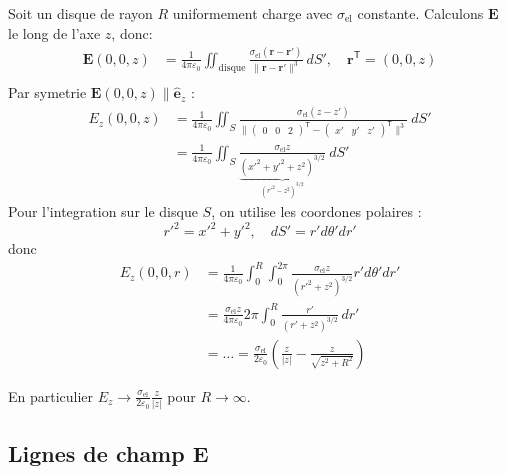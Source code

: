 \begin{example}
Soit un disque de rayon $R$ uniformement charge avec $\sigma _{\mathrm{el}}$ constante. Calculons $\boldsymbol{E}$ le long de l'axe $z$, donc:
\begin{align*}
\boldsymbol{E}(0,0,z) & =\frac{1}{4\pi \varepsilon _{0}}\iint _{\mathrm{disque}} \frac{\sigma _{\mathrm{el}}(\boldsymbol{r}-\boldsymbol{r}') }{\lVert \boldsymbol{r}-\boldsymbol{r}' \rVert ^{3}}~dS',\quad \boldsymbol{r}^{\mathsf{T}}=(0,0,z) \\
\end{align*}
Par symetrie $\boldsymbol{E}(0,0,z)\parallel \boldsymbol{\hat{e}}_{z}$ :
\begin{align*}
E_{z}(0,0,z) & =\frac{1}{4\pi\varepsilon_{0}}\iint _{S} \frac{\sigma _{\mathrm{el}}(z-z')}{\lVert \begin{pmatrix}
0 & 0 & 2
\end{pmatrix}^{\mathsf{T}}-\begin{pmatrix}
x' & y' & z'
\end{pmatrix}^{\mathsf{T}} \rVert ^{3}}~dS' \\
 & =\frac{1}{4\pi \varepsilon_{0}}\iint _{S} \frac{\sigma _{\mathrm{el}}z}{\underbrace{ (x'^{2}+y'^{2}+z^{2})^{3/2} }_{ (r'^{2}-z^{2})^{3/2} }}~dS'
\end{align*}
Pour l'integration sur le disque $S$, on utilise les coordones polaires :
$$
r'^{2}=x'^{2}+y'^{2},\quad dS'=r'd\theta'dr'
$$
donc
\begin{align*}
E_{z}(0,0,r) & =\frac{1}{4\pi\varepsilon_{0}}\int _{0}^{R}\int_{0}^{2\pi} \frac{\sigma _{\mathrm{el}}z}{(r'^{2}+z^{2})^{3/2} }r'd\theta'dr' \\
 & = \frac{\sigma _{\mathrm{el}}z}{4\pi\varepsilon_{0}} 2\pi \int_{0}^{R} \frac{r'}{(r'+z^{2})^{3/2}} \, dr' \\
  & =\dots = \frac{\sigma _{\mathrm{el}}}{2\varepsilon_{0}}\left( \frac{z}{|z|}-\frac{z}{\sqrt{ z^{2}+R^{2} }} \right) 
\end{align*}

En particulier $E_{z}\to \frac{\sigma _{\mathrm{el}}}{2\varepsilon_{0}} \frac{z}{|z|}$ pour $R\to \infty$.
\end{example}

\subsection{Lignes de champ \texorpdfstring{$\boldsymbol{E}$}{electrique}}

